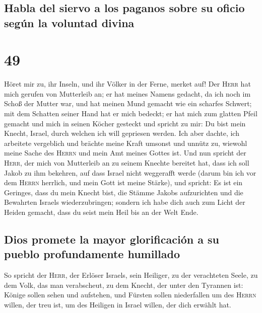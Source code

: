 \hypertarget{habla-del-siervo-a-los-paganos-sobre-su-oficio-seguxfan-la-voluntad-divina}{%
\subsection{Habla del siervo a los paganos sobre su oficio según la
voluntad
divina}\label{habla-del-siervo-a-los-paganos-sobre-su-oficio-seguxfan-la-voluntad-divina}}

\hypertarget{section-48}{%
\section{49}\label{section-48}}

 Höret mir zu, ihr Inseln, und ihr Völker in der Ferne,
merket auf! Der \textsc{Herr} hat mich gerufen von Mutterleib an; er hat
meines Namens gedacht, da ich noch im Schoß der Mutter war,
 und hat meinen Mund gemacht wie ein scharfes Schwert; mit
dem Schatten seiner Hand hat er mich bedeckt; er hat mich zum glatten
Pfeil gemacht und mich in seinen Köcher gesteckt  und
spricht zu mir: Du bist mein Knecht, Israel, durch welchen ich will
gepriesen werden.  Ich aber dachte, ich arbeitete
vergeblich und brächte meine Kraft umsonst und unnütz zu, wiewohl meine
Sache des \textsc{Herrn} und mein Amt meines Gottes ist. 
Und nun spricht der \textsc{Herr}, der mich von Mutterleib an zu seinem
Knechte bereitet hat, dass ich soll Jakob zu ihm bekehren, auf dass
Israel nicht weggerafft werde (darum bin ich vor dem \textsc{Herrn}
herrlich, und mein Gott ist meine Stärke),  und spricht:
Es ist ein Geringes, dass du mein Knecht bist, die Stämme Jakobs
aufzurichten und die Bewahrten Israels wiederzubringen; sondern ich habe
dich auch zum Licht der Heiden gemacht, dass du seist mein Heil bis an
der Welt Ende.

\hypertarget{dios-promete-la-mayor-glorificaciuxf3n-a-su-pueblo-profundamente-humillado}{%
\subsection{Dios promete la mayor glorificación a su pueblo
profundamente
humillado}\label{dios-promete-la-mayor-glorificaciuxf3n-a-su-pueblo-profundamente-humillado}}

 So spricht der \textsc{Herr}, der Erlöser Israels, sein
Heiliger, zu der verachteten Seele, zu dem Volk, das man verabscheut, zu
dem Knecht, der unter den Tyrannen ist: Könige sollen sehen und
aufstehen, und Fürsten sollen niederfallen um des \textsc{Herrn} willen,
der treu ist, um des Heiligen in Israel willen, der dich erwählt hat.

